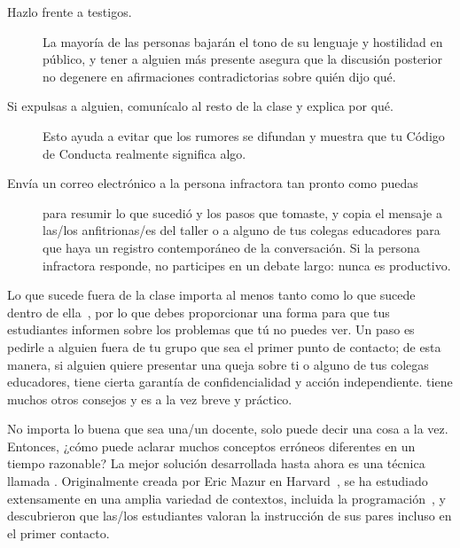 \begin{description}

\item[Hazlo frente a testigos.]
  La mayoría de las personas bajarán el tono de su lenguaje y hostilidad en público,
  y tener a alguien más presente asegura que
  la discusión posterior no degenere en afirmaciones contradictorias sobre quién dijo qué.

\item[Si expulsas a alguien, comunícalo al resto de la clase y explica por qué.]
  Esto ayuda a evitar que los rumores se difundan
  y muestra que tu Código de Conducta realmente significa algo.

\item[Envía un correo electrónico a la persona infractora tan pronto como puedas]
  para resumir lo que sucedió y los pasos que tomaste,
  y copia el mensaje a las/los anfitrionas/es del taller o a alguno de tus colegas educadores
  para que haya un registro contemporáneo de la conversación.
  Si la persona infractora responde,
  no participes en un debate largo:
  nunca es productivo.
 
\end{description}

Lo que sucede fuera de la clase importa al menos tanto como lo que sucede dentro de ella~\cite{Part2011},
por lo que debes proporcionar una forma para que tus estudiantes informen sobre los problemas que tú no puedes ver.
Un paso es pedirle a alguien fuera de tu grupo que sea el primer punto de contacto;
de esta manera,
si alguien quiere presentar una queja sobre ti o alguno de tus colegas educadores,
tiene cierta garantía de confidencialidad y acción independiente.
\cite{Auro2019} tiene muchos otros consejos
y es a la vez breve y práctico.


No importa lo buena que sea una/un docente,
solo puede decir una cosa a la vez.
Entonces, ¿cómo puede aclarar muchos conceptos erróneos diferentes en un tiempo razonable?
La mejor solución desarrollada hasta ahora es una técnica llamada .
Originalmente creada por Eric Mazur en Harvard~\cite{Mazu1996},
se ha estudiado extensamente en una amplia variedad de contextos,
incluida la programación~\cite{Crou2001,Port2013},
y~\cite{Port2016} descubrieron que las/los estudiantes valoran la instrucción de sus pares incluso en el primer contacto.

